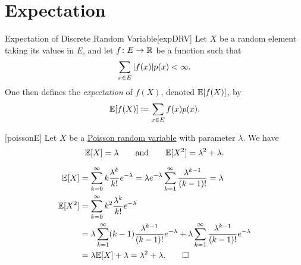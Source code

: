 \documentclass[../probability.tex]{subfiles}
\begin{document}
\section{Expectation}

\begin{Definition}{Expectation of Discrete Random Variable}[expDRV]
    Let \(X\) be a random element taking its values in \(E\),
    and let \(f \colon E \to \RR\) be a function such that
    \begin{equation}\label{eq:expAssum}
        \sum_{x \in E} |f(x)| p(x) < \infty\text.
    \end{equation}
    One then defines the \emph{expectation} of \(f(X)\), denoted
    \(\mathbb{E}[f(X)]\), by
    \[
        \mathbb{E}[f(X)] \coloneqq \sum_{x \in E} f(x) p(x)\text.
    \]
\end{Definition}


\begin{Exercise}{}[poissonE]
    Let \(X\) be a \hyperlink{exmp:poisson}{Poisson random variable} with parameter \(\lambda\).
    We have
    \[
        \mathbb{E}[X] = \lambda\text
        \qquad\text{and}\qquad
        \mathbb{E}[X^2] = \lambda^2 + \lambda\text.
    \]
\end{Exercise}
\begin{solution}
    \begin{align*}
        \mathbb{E}[X]
        &= \sum_{k=0}^\infty k \frac{\lambda^k}{k!} e^{-\lambda}
        = \lambda e^{-\lambda}\sum_{k=1}^\infty \frac{\lambda^{k-1}}{(k-1)!} = \lambda \\
        \mathbb{E}[X^2]
        &= \sum_{k=0}^\infty k^2 \frac{\lambda^k}{k!} e^{-\lambda} \\
        &= \lambda\sum_{k=1}^\infty (k-1) \frac{\lambda^{k-1}}{(k-1)!} e^{-\lambda}
        + \lambda\sum_{k=1}^\infty \frac{\lambda^{k-1}}{(k-1)!} e^{-\lambda} \\
        &= \lambda\mathbb{E}[X] + \lambda = \lambda^2 + \lambda\text.
        \qedhere
    \end{align*}
\end{solution}

\end{document}
